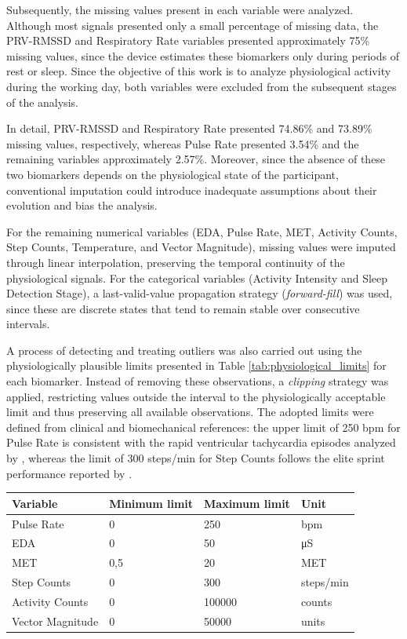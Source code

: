 \documentclass[a4paper,fleqn]{cas-sc}
\newcommand{\newtextorange}[1]{{\color{revorange}#1}}
\begin{document}
Subsequently, the missing values present in each variable were analyzed. Although most signals presented only a small percentage of missing data, the PRV-RMSSD and Respiratory Rate variables presented approximately 75\% missing values, since the device estimates these biomarkers only during periods of rest or sleep. Since the objective of this work is to analyze physiological activity during the working day, both variables were excluded from the subsequent stages of the analysis.

\newtextorange{In detail, PRV-RMSSD and Respiratory Rate presented 74.86\% and 73.89\% missing values, respectively, whereas Pulse Rate presented 3.54\% and the remaining variables approximately 2.57\%. Moreover, since the absence of these two biomarkers depends on the physiological state of the participant, conventional imputation could introduce inadequate assumptions about their evolution and bias the analysis.}

For the remaining numerical variables (EDA, Pulse Rate, MET, Activity Counts, Step Counts, Temperature, and Vector Magnitude), missing values were imputed through linear interpolation, preserving the temporal continuity of the physiological signals. For the categorical variables (Activity Intensity and Sleep Detection Stage), a last-valid-value propagation strategy (\textit{forward-fill}) was used, since these are discrete states that tend to remain stable over consecutive intervals.

A process of detecting and treating outliers was also carried out using the physiologically plausible limits presented in Table \ref{tab:physiological_limits} for each biomarker. Instead of removing these observations, a \textit{clipping} strategy was applied, restricting values outside the interval to the physiologically acceptable limit and thus preserving all available observations. \newtextorange{The adopted limits were defined from clinical and biomechanical references: the upper limit of 250 bpm for Pulse Rate is consistent with the rapid ventricular tachycardia episodes analyzed by \citet{wathen2004}, whereas the limit of 300 steps/min for Step Counts follows the elite sprint performance reported by \citet{stuhec2023}.}

\begin{center}
\label{tab:physiological_limits}
\small
\begin{tabular*}{.95\textwidth}{@{} p{.32\linewidth} p{.20\linewidth} p{.20\linewidth} p{.18\linewidth} @{} }
\toprule
\textbf{Variable} & \textbf{Minimum limit} & \textbf{Maximum limit} & \textbf{Unit} \\
\midrule
Pulse Rate & 0 & 250 & bpm \\
EDA & 0 & 50 & \si{\micro\siemens} \\
MET & 0,5 & 20 & MET \\
Step Counts & 0 & 300 & steps/min \\
Activity Counts & 0 & 100000 & counts \\
Vector Magnitude & 0 & 50000 & units \\
\bottomrule
\end{tabular*}
\end{center}
\end{document}
